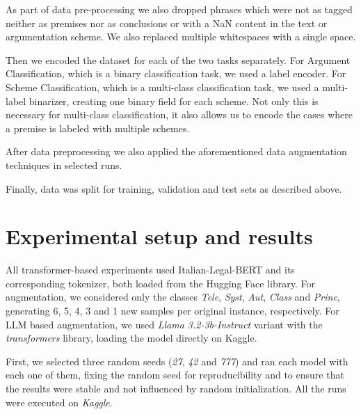 \documentclass[11pt]{article}
\begin{document}
As part of data pre-processing we also dropped phrases which were not as tagged neither as premises nor as conclusions or with a NaN content in the text or argumentation scheme. We also replaced multiple whitespaces with a single space.

Then we encoded the dataset for each of the two tasks separately.
For Argument Classification, which is a binary classification task, we used a label encoder.
For Scheme Classification, which is a multi-class classification task, we used a multi-label binarizer, creating one binary field for each scheme. Not only this is necessary for multi-class classification, it also allows us to encode the cases where a premise is labeled with multiple schemes.

After data preprocessing we also applied the aforementioned data augmentation techniques in selected runs.

Finally, data was split for training, validation and test sets as described above.

\section{Experimental setup and results}
\label{sec:results}

All transformer-based experiments used Italian-Legal-BERT and its corresponding tokenizer, both loaded from the Hugging Face library.
For augmentation, we considered only the classes \textit{Tele}, \textit{Syst}, \textit{Aut}, \textit{Class} and \textit{Princ}, generating 6, 5, 4, 3 and 1 new samples per original instance, respectively.
For LLM based augmentation, we used \textit{Llama 3.2-3b-Instruct} variant with the \textit{transformers} library, loading the model directly on Kaggle. 

First, we selected three random seeds (\textit{27}, \textit{42} and \textit{777}) and ran each model with each one of them, fixing the random seed for reproducibility and to ensure that the results were stable and not influenced by random initialization. All the runs were executed on \textit{Kaggle}.
\end{document}
